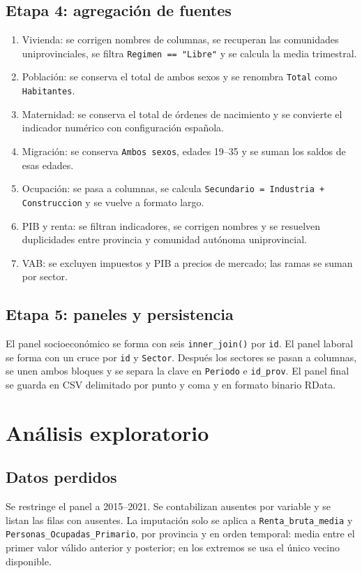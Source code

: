 \documentclass[11pt,a4paper]{article}
\newcommand{\code}[1]{\texttt{\small #1}}
\begin{document}
\subsection{Etapa 4: agregación de fuentes}
\begin{enumerate}[leftmargin=1.7em]
\item Vivienda: se corrigen nombres de columnas, se recuperan las comunidades uniprovinciales, se filtra \code{Regimen == "Libre"} y se calcula la media trimestral.
\item Población: se conserva el total de ambos sexos y se renombra \code{Total} como \code{Habitantes}.
\item Maternidad: se conserva el total de órdenes de nacimiento y se convierte el indicador numérico con configuración española.
\item Migración: se conserva \code{Ambos sexos}, edades 19--35 y se suman los saldos de esas edades.
\item Ocupación: se pasa a columnas, se calcula \code{Secundario = Industria + Construccion} y se vuelve a formato largo.
\item PIB y renta: se filtran indicadores, se corrigen nombres y se resuelven duplicidades entre provincia y comunidad autónoma uniprovincial.
\item VAB: se excluyen impuestos y PIB a precios de mercado; las ramas se suman por sector.
\end{enumerate}

\subsection{Etapa 5: paneles y persistencia}
El panel socioeconómico se forma con seis \code{inner\_join()} por \code{id}. El panel laboral se forma con un cruce por \code{id} y \code{Sector}. Después los sectores se pasan a columnas, se unen ambos bloques y se separa la clave en \code{Periodo} e \code{id\_prov}. El panel final se guarda en CSV delimitado por punto y coma y en formato binario RData.

\section{Análisis exploratorio}
\subsection{Datos perdidos}
Se restringe el panel a 2015--2021. Se contabilizan ausentes por variable y se listan las filas con ausentes. La imputación solo se aplica a \code{Renta\_bruta\_media} y \code{Personas\_Ocupadas\_Primario}, por provincia y en orden temporal: media entre el primer valor válido anterior y posterior; en los extremos se usa el único vecino disponible.
\end{document}
